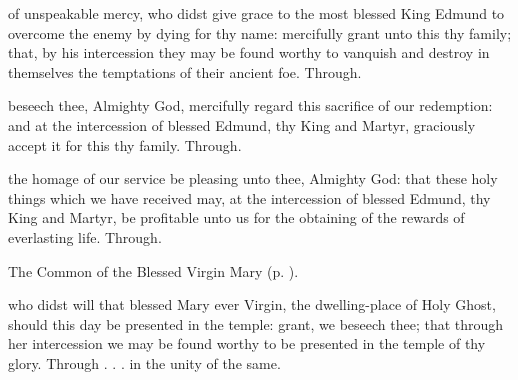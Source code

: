  of unspeakable mercy, who didst give grace to the most blessed King Edmund to overcome the enemy by dying for thy name: mercifully grant unto this thy family; that, by his intercession they may be found worthy to vanquish and destroy in themselves the temptations of their ancient foe. Through.

\vspace{-0.2\baselineskip}

\secret

\vspace{-0.1\baselineskip}

 beseech thee, Almighty God, mercifully regard this sacrifice of our redemption: and at the intercession of blessed Edmund, thy King and Martyr, graciously accept it for this thy family. Through.

\vspace{-0.2\baselineskip}

\postcommunion

\vspace{-0.1\baselineskip}

 the homage of our service be pleasing unto thee, Almighty God: that these holy things which we have received may, at the intercession of blessed Edmund, thy King and Martyr, be profitable unto us for the obtaining of the rewards of everlasting life. Through.



\begin{rubric}
	The Common of the Blessed Virgin Mary (p. \pageref{CommonBVM}).
\end{rubric}

\vspace{-0.2\baselineskip}

\collect

\vspace{-0.1\baselineskip}

 who didst will that blessed Mary ever Virgin, the dwelling-place of Holy Ghost, should this day be presented in the temple: grant, we beseech thee; that through her intercession we may be found worthy to be presented in the temple of thy glory. Through . . . in the unity of the same.

\vspace{-0.2\baselineskip}

